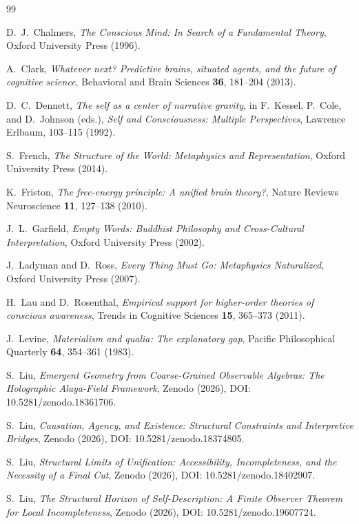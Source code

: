 \documentclass[12pt]{article}
\begin{document}
\begin{thebibliography}{99}

D.~J.~Chalmers,
\emph{The Conscious Mind: In Search of a Fundamental Theory},
Oxford University Press (1996).

A.~Clark,
\emph{Whatever next? Predictive brains, situated agents, and the future of cognitive science},
Behavioral and Brain Sciences \textbf{36}, 181--204 (2013).

D.~C.~Dennett,
\emph{The self as a center of narrative gravity},
in F.~Kessel, P.~Cole, and D.~Johnson (eds.),
\emph{Self and Consciousness: Multiple Perspectives},
Lawrence Erlbaum, 103--115 (1992).

S.~French,
\emph{The Structure of the World: Metaphysics and Representation},
Oxford University Press (2014).

K.~Friston,
\emph{The free-energy principle: A unified brain theory?},
Nature Reviews Neuroscience \textbf{11}, 127--138 (2010).

J.~L.~Garfield,
\emph{Empty Words: Buddhist Philosophy and Cross-Cultural Interpretation},
Oxford University Press (2002).

J.~Ladyman and D.~Ross,
\emph{Every Thing Must Go: Metaphysics Naturalized},
Oxford University Press (2007).

H.~Lau and D.~Rosenthal,
\emph{Empirical support for higher-order theories of conscious awareness},
Trends in Cognitive Sciences \textbf{15}, 365--373 (2011).

J.~Levine,
\emph{Materialism and qualia: The explanatory gap},
Pacific Philosophical Quarterly \textbf{64}, 354--361 (1983).

S.~Liu,
\emph{Emergent Geometry from Coarse-Grained Observable Algebras: The Holographic Alaya-Field Framework},
Zenodo (2026), DOI: 10.5281/zenodo.18361706.

S.~Liu,
\emph{Causation, Agency, and Existence: Structural Constraints and Interpretive Bridges},
Zenodo (2026), DOI: 10.5281/zenodo.18374805.

S.~Liu,
\emph{Structural Limits of Unification: Accessibility, Incompleteness, and the Necessity of a Final Cut},
Zenodo (2026), DOI: 10.5281/zenodo.18402907.

S.~Liu,
\emph{The Structural Horizon of Self-Description: A Finite Observer Theorem for Local Incompleteness},
Zenodo (2026), DOI: 10.5281/zenodo.19607724.


\end{thebibliography}
\end{document}
